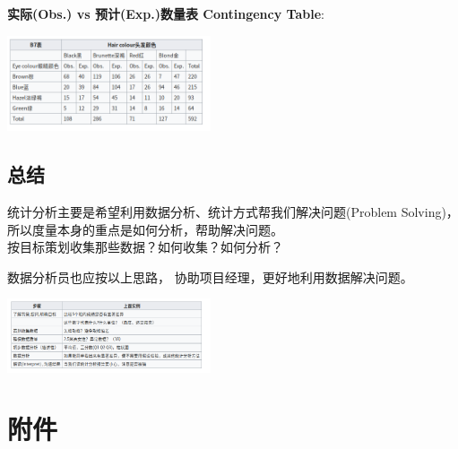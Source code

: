 \textbf{实际(Obs.) vs 预计(Exp.)数量表 Contingency Table}:

\includegraphics[width=6cm]{Screenshotfrom2023-01-0222-21-11.png}

\begin{description}
\item[]
\end{description}


\hypertarget{ux5982ux4f55ux753bux830eux53f6ux56festem-and-leaf-plot}{%
\subsection{总结}\label{ux5982ux4f55ux753bux830eux53f6ux56festem-and-leaf-plot}}


统计分析主要是希望利用数据分析、统计方式帮我们解决问题(Problem
Solving)，所以度量本身的重点是如何分析，帮助解决问题。\\
按目标策划收集那些数据？如何收集？如何分析？

数据分析员也应按以上思路， 协助项目经理，更好地利用数据解决问题。

\includegraphics[width=6cm]{Screenshotfrom2023-01-0222-21-59.png}

\hypertarget{ux9644ux4ef6}{%
\section{附件}\label{ux9644ux4ef6}}

